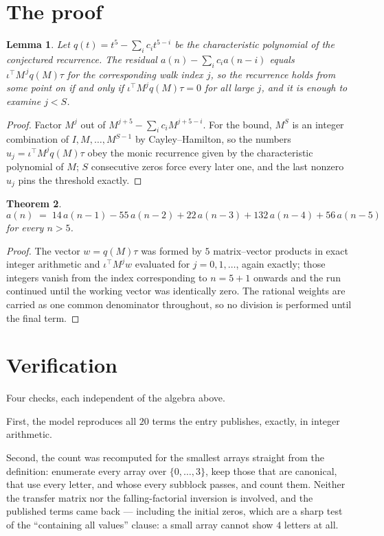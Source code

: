 \documentclass[11pt,a4paper]{article}
\theoremstyle{plain}
\newtheorem{theorem}{Theorem}
\newtheorem{lemma}[theorem]{Lemma}
\theoremstyle{definition}
\begin{document}
\section{The proof}

\begin{lemma}\label{lem:crit}
Let $q(t)=t^{5}-\sum_i c_it^{5-i}$ be the characteristic polynomial of the
conjectured recurrence. The residual $a(n)-\sum_ic_ia(n-i)$ equals
$\iota^{\!\top}M^{\,j}q(M)\tau$ for the corresponding walk index $j$, so the recurrence
holds from some point on if and only if $\iota^{\!\top}M^{j}q(M)\tau=0$ for all large $j$,
and it is enough to examine $j<S$.
\end{lemma}

\begin{proof}
Factor $M^{j}$ out of $M^{j+5}-\sum_ic_iM^{j+5-i}$. For the bound, $M^{S}$
is an integer combination of $I,M,\dots,M^{S-1}$ by Cayley--Hamilton, so the numbers
$u_j=\iota^{\!\top}M^{j}q(M)\tau$ obey the monic recurrence given by the characteristic
polynomial of $M$; $S$ consecutive zeros force every later one, and the last nonzero $u_j$
pins the threshold exactly.
\end{proof}

\begin{theorem}
\[
a(n)\;=\;14\,a(n-1) - 55\,a(n-2) + 22\,a(n-3) + 132\,a(n-4) + 56\,a(n-5)
\]
for every $n>5$.
\end{theorem}

\begin{proof}
The vector $w=q(M)\tau$ was formed by $5$ matrix--vector products in exact integer
arithmetic and $\iota^{\!\top}M^{j}w$ evaluated for $j=0,1,\dots$, again exactly; those
integers vanish from the index corresponding to $n=5+1$ onwards and the run continued
until the working vector was identically zero. The rational weights are carried as one common
denominator throughout, so no division is performed until the final term.
\end{proof}

\section{Verification}

Four checks, each independent of the algebra above.

First, the model reproduces all $20$ terms the entry publishes, exactly, in integer
arithmetic.

Second, the count was recomputed for the smallest arrays straight from the definition:
enumerate every array over $\{0,\dots,3\}$, keep those that are canonical, that use every
letter, and whose every subblock passes, and count them. Neither the transfer matrix nor the
falling-factorial inversion is involved, and the published terms came back --- including the
initial zeros, which are a sharp test of the ``containing all values'' clause: a small array
cannot show $4$ letters at all.
\end{document}

